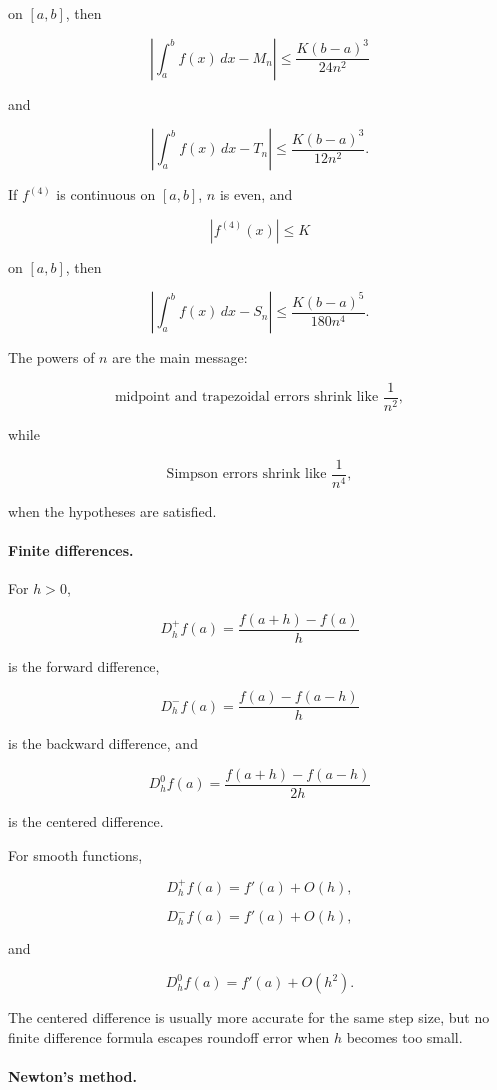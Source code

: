 on \([a,b]\), then

\[
\boxed{
\left|\int_a^b f(x)\,dx-M_n\right|
\le
\frac{K(b-a)^3}{24n^2}
}
\]

and

\[
\boxed{
\left|\int_a^b f(x)\,dx-T_n\right|
\le
\frac{K(b-a)^3}{12n^2}.
}
\]

If \(f^{(4)}\) is continuous on \([a,b]\), \(n\) is even, and

\[
|f^{(4)}(x)|\le K
\]

on \([a,b]\), then

\[
\boxed{
\left|\int_a^b f(x)\,dx-S_n\right|
\le
\frac{K(b-a)^5}{180n^4}.
}
\]

The powers of \(n\) are the main message:

\[
\text{midpoint and trapezoidal errors shrink like } \frac1{n^2},
\]

while

\[
\text{Simpson errors shrink like } \frac1{n^4},
\]

when the hypotheses are satisfied.

\paragraph{Finite differences.}

For \(h>0\),

\[
\boxed{
D_h^+f(a)=\frac{f(a+h)-f(a)}{h}
}
\]

is the forward difference,

\[
\boxed{
D_h^-f(a)=\frac{f(a)-f(a-h)}{h}
}
\]

is the backward difference, and

\[
\boxed{
D_h^0f(a)=\frac{f(a+h)-f(a-h)}{2h}
}
\]

is the centered difference.

For smooth functions,

\[
D_h^+f(a)=f'(a)+O(h),
\]

\[
D_h^-f(a)=f'(a)+O(h),
\]

and

\[
D_h^0f(a)=f'(a)+O(h^2).
\]

The centered difference is usually more accurate for the same step size, but no finite
difference formula escapes roundoff error when \(h\) becomes too small.

\paragraph{Newton's method.}

